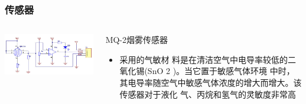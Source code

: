 ﻿\documentclass{beamer}
\begin{document}
\begin{frame}
\frametitle{传感器}
\begin{columns}
\begin{column}{0.50\textwidth}
\includegraphics[width=\textwidth]{./img/M}
\end{column}
\begin{column}{0.50\textwidth}
\begin{block}{MQ-2烟雾传感器}
\begin{itemize}
\item 采用的气敏材
料是在清洁空气中电导率较低的二氧化锡(SnO 2 )。当它置于敏感气体环境
中时，其电导率随空气中敏感气体浓度的增大而增大。该传感器对于液化
气、丙烷和氢气的灵敏度非常高

\end{itemize}
\end{block}
\end{column}
\end{columns}
\end{frame}
\end{document}
